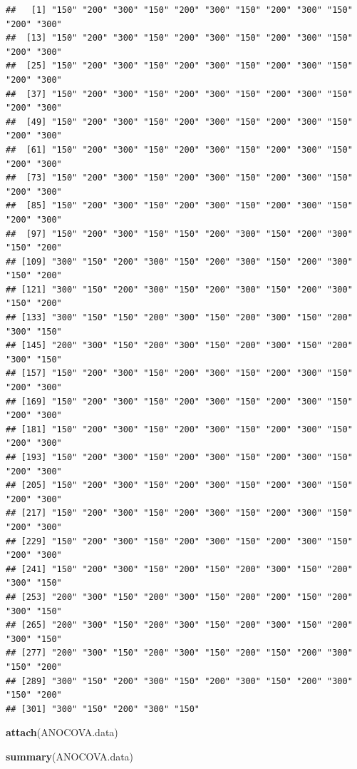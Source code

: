 \documentclass[]{article}
\newenvironment{Shaded}{\begin{snugshade}}{\end{snugshade}}
\newcommand{\KeywordTok}[1]{\textcolor[rgb]{0.13,0.29,0.53}{\textbf{#1}}}
\newcommand{\NormalTok}[1]{#1}
\begin{document}
\begin{verbatim}
##   [1] "150" "200" "300" "150" "200" "300" "150" "200" "300" "150" "200" "300"
##  [13] "150" "200" "300" "150" "200" "300" "150" "200" "300" "150" "200" "300"
##  [25] "150" "200" "300" "150" "200" "300" "150" "200" "300" "150" "200" "300"
##  [37] "150" "200" "300" "150" "200" "300" "150" "200" "300" "150" "200" "300"
##  [49] "150" "200" "300" "150" "200" "300" "150" "200" "300" "150" "200" "300"
##  [61] "150" "200" "300" "150" "200" "300" "150" "200" "300" "150" "200" "300"
##  [73] "150" "200" "300" "150" "200" "300" "150" "200" "300" "150" "200" "300"
##  [85] "150" "200" "300" "150" "200" "300" "150" "200" "300" "150" "200" "300"
##  [97] "150" "200" "300" "150" "150" "200" "300" "150" "200" "300" "150" "200"
## [109] "300" "150" "200" "300" "150" "200" "300" "150" "200" "300" "150" "200"
## [121] "300" "150" "200" "300" "150" "200" "300" "150" "200" "300" "150" "200"
## [133] "300" "150" "150" "200" "300" "150" "200" "300" "150" "200" "300" "150"
## [145] "200" "300" "150" "200" "300" "150" "200" "300" "150" "200" "300" "150"
## [157] "150" "200" "300" "150" "200" "300" "150" "200" "300" "150" "200" "300"
## [169] "150" "200" "300" "150" "200" "300" "150" "200" "300" "150" "200" "300"
## [181] "150" "200" "300" "150" "200" "300" "150" "200" "300" "150" "200" "300"
## [193] "150" "200" "300" "150" "200" "300" "150" "200" "300" "150" "200" "300"
## [205] "150" "200" "300" "150" "200" "300" "150" "200" "300" "150" "200" "300"
## [217] "150" "200" "300" "150" "200" "300" "150" "200" "300" "150" "200" "300"
## [229] "150" "200" "300" "150" "200" "300" "150" "200" "300" "150" "200" "300"
## [241] "150" "200" "300" "150" "200" "150" "200" "300" "150" "200" "300" "150"
## [253] "200" "300" "150" "200" "300" "150" "200" "200" "150" "200" "300" "150"
## [265] "200" "300" "150" "200" "300" "150" "200" "300" "150" "200" "300" "150"
## [277] "200" "300" "150" "200" "300" "150" "200" "150" "200" "300" "150" "200"
## [289] "300" "150" "200" "300" "150" "200" "300" "150" "200" "300" "150" "200"
## [301] "300" "150" "200" "300" "150"
\end{verbatim}

\begin{Shaded}
\begin{Highlighting}[]
\KeywordTok{attach}\NormalTok{(ANOCOVA.data)}

\KeywordTok{summary}\NormalTok{(ANOCOVA.data)}
\end{Highlighting}
\end{Shaded}
\end{document}
